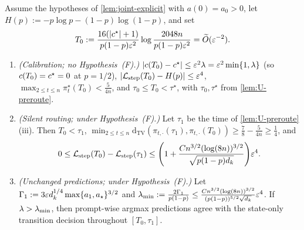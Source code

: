 \begin{lemma}
\label{lem:silent-routing}
Assume the hypotheses of \cref{lem:joint-explicit} with $a(0) = a_0 > 0$, let $H(p) := -p\log p - (1-p)\log(1-p)$, and set
\[
  T_0 := \frac{16(|c^\star| + 1)}{p(1-p)\varepsilon^2}\log\frac{2048n}{p(1-p)\varepsilon^2} = \widetilde O(\varepsilon^{-2}).
\]
\begin{enumerate}[label=(\alph*),leftmargin=*]
\item \emph{(Calibration; no Hypothesis~(F).)} $|c(T_0) - c^\star| \le \varepsilon^2\lambda = \varepsilon^2\min\{1, \lambda\}$ (so $c(T_0) = c^\star = 0$ at $p = 1/2$), $|\mathcal L_{\mathrm{step}}(T_0) - H(p)| \le \varepsilon^4$, $\max_{2\le t\le n}\pi_t^\star(T_0) < \frac{5}{4n}$, and $\tau_0 \le T_0 < \tau^\star$, with $\tau_0, \tau^\star$ from \cref{lem:U-preroute}.
\item \emph{(Silent routing; under Hypothesis~(F).)} Let $\tau_1$ be the time of \cref{lem:U-preroute}(iii). Then $T_0 < \tau_1$, $\min_{2\le t\le n}\mathrm{d}_{\mathrm{TV}}(\pi_{t,\cdot}(\tau_1), \pi_{t,\cdot}(T_0)) \ge \frac{7}{8} - \frac{5}{4n} \ge \frac{1}{4}$, and
\[
  0 \le \mathcal L_{\mathrm{step}}(T_0) - \mathcal L_{\mathrm{step}}(\tau_1) \le \Biggl(1 + \frac{C n^{3/2}(\log(8n))^{3/2}}{\sqrt{p(1-p)d_k}}\Biggr)\varepsilon^4.
\]
\item \emph{(Unchanged predictions; under Hypothesis~(F).)} Let $\Gamma_1 := 3\varepsilon d_k^{1/4}\max\{a_1, a_\star\}^{3/2}$ and $\lambda_{\min} := \frac{2\Gamma_1}{p(1-p)} \le \frac{C n^{3/2}(\log(8n))^{3/2}}{(p(1-p))^{5/2}\sqrt{d_k}}\varepsilon^4$. If $\lambda > \lambda_{\min}$, then prompt-wise argmax predictions agree with the state-only transition decision throughout $[T_0, \tau_1]$.
\end{enumerate}
\end{lemma}
